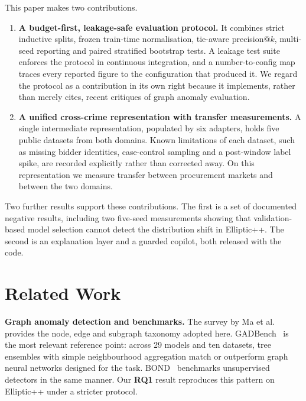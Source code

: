 \documentclass[conference]{IEEEtran}
\newcommand{\RQ}[1]{\textbf{RQ#1}}
\begin{document}
This paper makes two contributions.

\begin{enumerate}
\item \textbf{A budget-first, leakage-safe evaluation protocol.} It combines
strict inductive splits, frozen train-time normalisation, tie-aware
precision@$k$, multi-seed reporting and paired stratified bootstrap tests. A
leakage test suite enforces the protocol in continuous integration, and a
number-to-config map traces every reported figure to the configuration that
produced it. We regard the protocol as a contribution in its own right because
it implements, rather than merely cites, recent critiques of graph anomaly
evaluation.
\item \textbf{A unified cross-crime representation with transfer
measurements.} A single intermediate representation, populated by six adapters,
holds five public datasets from both domains. Known limitations of each
dataset, such as missing bidder identities, case-control sampling and a
post-window label spike, are recorded explicitly rather than corrected away. On
this representation we measure transfer between procurement markets and
between the two domains.
\end{enumerate}

Two further results support these contributions. The first is a set of
documented negative results, including two five-seed measurements showing that
validation-based model selection cannot detect the distribution shift in
Elliptic++. The second is an explanation layer and a guarded copilot, both
released with the code.

\section{Related Work}

\textbf{Graph anomaly detection and benchmarks.} The survey by Ma et
al.~\cite{ma2023} provides the node, edge and subgraph taxonomy adopted here.
GADBench~\cite{gadbench} is the most relevant reference point: across 29 models
and ten datasets, tree ensembles with simple neighbourhood aggregation match or
outperform graph neural networks designed for the task. BOND~\cite{liu2022bond}
benchmarks unsupervised detectors in the same manner. Our \RQ{1} result
reproduces this pattern on Elliptic++ under a stricter protocol.
\end{document}
